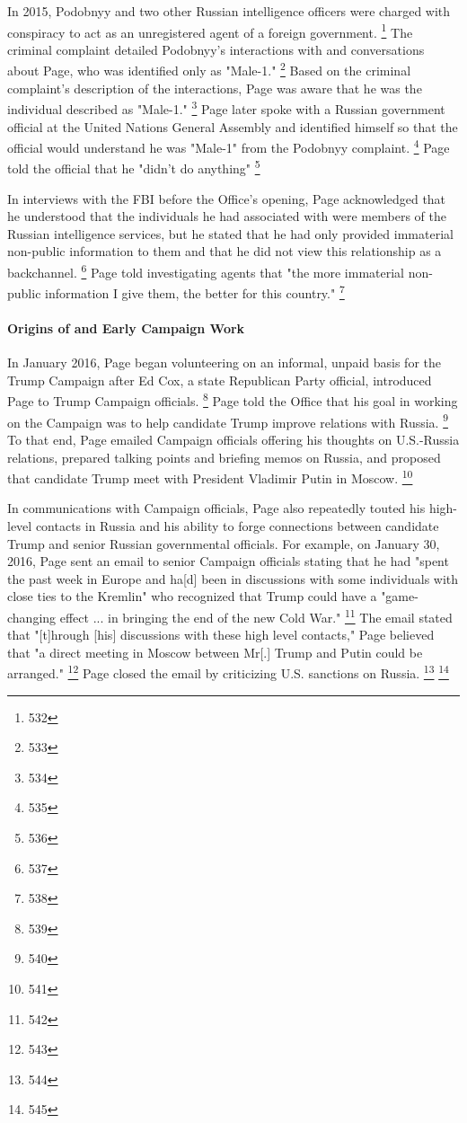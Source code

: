 In 2015, Podobnyy and two other Russian intelligence officers were charged with conspiracy to act as an unregistered agent of a foreign government.%
\footnote{532}
The criminal complaint detailed Podobnyy's interactions with and conversations about Page, who was identified only as "Male-1."%
\footnote{533}
Based on the criminal complaint's description of the interactions, Page was aware that he was the individual described as "Male-1."%
\footnote{534}
Page later spoke with a Russian government official at the United Nations General Assembly and identified himself so that the official would understand he was "Male-1" from the Podobnyy complaint. %
\footnote{535}
Page told the official that he "didn't do anything"
\footnote{536}

In interviews with the FBI before the Office's opening, Page acknowledged that he understood that the individuals he had associated with were members of the Russian intelligence services, but he stated that he had only provided immaterial non-public information to them and that he did not view this relationship as a backchannel.%
\footnote{537}
Page told investigating agents that "the more immaterial non-public information I give them, the better for this country."%
\footnote{538}

\paragraph{Origins of and Early Campaign Work}

In January 2016, Page began volunteering on an informal, unpaid basis for the Trump Campaign after Ed Cox, a state Republican Party official, introduced Page to Trump Campaign officials.%
\footnote{539}
Page told the Office that his goal in working on the Campaign was to help candidate Trump improve relations with Russia.%
\footnote{540}
To that end, Page emailed Campaign officials offering his thoughts on U.S.-Russia relations, prepared talking points and briefing memos on Russia, and proposed that candidate Trump meet with President Vladimir Putin in Moscow.%
\footnote{541}

In communications with Campaign officials, Page also repeatedly touted his high-level contacts in Russia and his ability to forge connections between candidate Trump and senior Russian governmental officials.
For example, on January 30, 2016, Page sent an email to senior Campaign officials stating that he had "spent the past week in Europe and ha[d] been in discussions with some individuals with close ties to the Kremlin" who recognized that Trump could have a "game-changing effect ... in bringing the end of the new Cold War."%
\footnote{542}
The email stated that "[t]hrough [his] discussions with these high level contacts," Page believed that "a direct meeting in Moscow between Mr[.] Trump and Putin could be arranged."%
\footnote{543}
Page closed the email by criticizing U.S. sanctions on Russia.%
\footnote{544}
\footnote{545}

